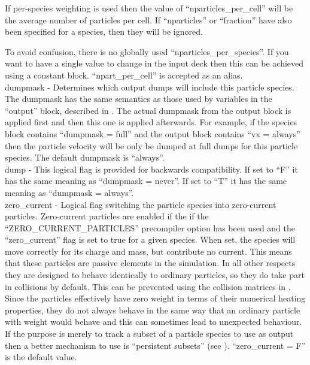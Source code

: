 If per-species weighting is used then the value of ``nparticles\_per\_cell''
will be the average number of particles per cell.  If ``nparticles'' or
``fraction'' have also been specified for a species, then they will be ignored.

To avoid confusion, there is no globally used ``nparticles\_per\_species''. If
you want to have a single value to change in the input deck then this can be
achieved using a constant block. ``npart\_per\_cell'' is accepted as an alias.\\

{\emphtext dumpmask} - Determines which output dumps will include this
particle species. The dumpmask has the same semantics as those used
by variables in the ``output'' block, described in .
The actual dumpmask from the output block is applied first and then
this one is applied afterwards. For example, if the species block contains
``dumpmask = full'' and the output block contains ``vx = always''
then the particle velocity will be only be dumped at full dumps for
this particle species. The default dumpmask is ``always''.\\

{\emphtext dump} - This logical flag is provided for backwards compatibility.
If set to ``F'' it has the same meaning as ``dumpmask = never''. If set to
``T'' it has the same meaning as ``dumpmask = always''.\\

{\emphtext zero\_current} - Logical flag switching the particle species
into zero-current particles. Zero-current particles are enabled if the
if the ``ZERO\_CURRENT\_PARTICLES'' precompiler option has been used and
the ``zero\_current'' flag is set to true for a given species.
When set, the species will move
correctly for its charge and mass, but contribute no current. This means that
these particles are passive elements in the simulation. In all other respects
they are designed to behave identically to ordinary particles, so they do take
part in collisions by default. This can be prevented using the collision
matrices in .
\warn Since the particles effectively have zero weight in terms of their
numerical heating properties, they
do not always behave in the same way that an ordinary particle with weight
would behave and this can sometimes lead to unexpected behaviour. If the
purpose is merely to track a subset of a particle species to use as output
then a better mechanism to use is ``persistent subsets''
(see ).
``zero\_current = F'' is the default value.\\

